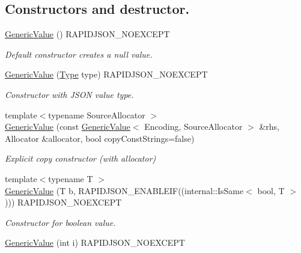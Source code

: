 \subsection*{Constructors and destructor.}
\begin{DoxyCompactItemize}
\item 
\hyperlink{classGenericValue_ab0205d57176d83814ea4e4598c596fe8}{Generic\+Value} () R\+A\+P\+I\+D\+J\+S\+O\+N\+\_\+\+N\+O\+E\+X\+C\+E\+PT\hypertarget{classGenericValue_ab0205d57176d83814ea4e4598c596fe8}{}\label{classGenericValue_ab0205d57176d83814ea4e4598c596fe8}

\begin{DoxyCompactList}\small\item\em Default constructor creates a null value. \end{DoxyCompactList}\item 
\hyperlink{classGenericValue_a83c8f84b8e61f2f40414b703b75aea61}{Generic\+Value} (\hyperlink{rapidjson_8h_a1d1cfd8ffb84e947f82999c682b666a7}{Type} type) R\+A\+P\+I\+D\+J\+S\+O\+N\+\_\+\+N\+O\+E\+X\+C\+E\+PT
\begin{DoxyCompactList}\small\item\em Constructor with J\+S\+ON value type. \end{DoxyCompactList}\item 
{\footnotesize template$<$typename Source\+Allocator $>$ }\\\hyperlink{classGenericValue_a76c68b72723a06045776dbd425f9e8b6}{Generic\+Value} (const \hyperlink{classGenericValue}{Generic\+Value}$<$ Encoding, Source\+Allocator $>$ \&rhs, Allocator \&allocator, bool copy\+Const\+Strings=false)
\begin{DoxyCompactList}\small\item\em Explicit copy constructor (with allocator) \end{DoxyCompactList}\item 
{\footnotesize template$<$typename T $>$ }\\\hyperlink{classGenericValue_a0f6a0394bfffaedde88e433b2265194c}{Generic\+Value} (T b, R\+A\+P\+I\+D\+J\+S\+O\+N\+\_\+\+E\+N\+A\+B\+L\+E\+IF((internal\+::\+Is\+Same$<$ bool, T $>$))) R\+A\+P\+I\+D\+J\+S\+O\+N\+\_\+\+N\+O\+E\+X\+C\+E\+PT
\begin{DoxyCompactList}\small\item\em Constructor for boolean value. \end{DoxyCompactList}\item 
\hyperlink{classGenericValue_aafc754ade38421c179f5c8933ecbaf45}{Generic\+Value} (int i) R\+A\+P\+I\+D\+J\+S\+O\+N\+\_\+\+N\+O\+E\+X\+C\+E\+PT\hypertarget{classGenericValue_aafc754ade38421c179f5c8933ecbaf45}{}\label{classGenericValue_aafc754ade38421c179f5c8933ecbaf45}


\end{DoxyCompactItemize}
